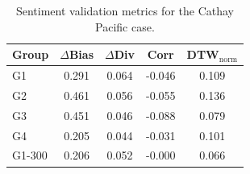 \begin{table}[t]
\centering
\caption{Sentiment validation metrics for the Cathay Pacific case.}
\label{tab:cathay_metrics}
\begin{tabular}{lcccc}
\toprule
Group & $\Delta$Bias & $\Delta$Div & Corr & DTW$_{\mathrm{norm}}$ \\
\midrule
G1 & 0.291 & 0.064 & -0.046 & 0.109 \\
G2 & 0.461 & 0.056 & -0.055 & 0.136 \\
G3 & 0.451 & 0.046 & -0.088 & 0.079 \\
G4 & 0.205 & 0.044 & -0.031 & 0.101 \\
G1-300 & 0.206 & 0.052 & -0.000 & 0.066 \\
\bottomrule
\end{tabular}
\end{table}
